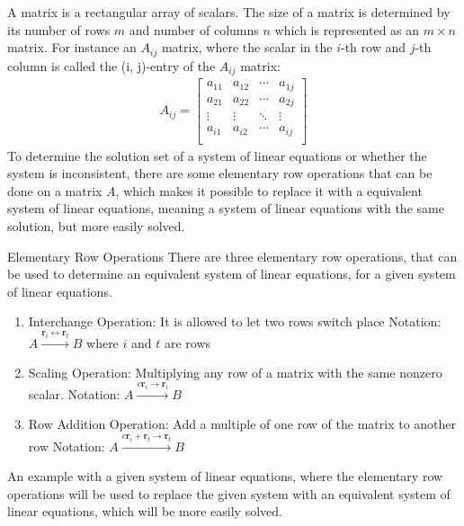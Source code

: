 A matrix is a rectangular array of scalars. The size of a matrix is determined by its number of rows $m$ and number of columns $n$ which is represented as an $m \times n$ matrix. 
For instance an $A_{ij}$ matrix, where the scalar in the $i$-th row and $j$-th column is called the (i, j)-entry of the $A_{ij}$ matrix:
\begin{align*}
    A_{ij} = 
    \begin{bmatrix}
    a_{1 1} & a_{1 2} & \cdots & a_{1 j}\\
    a_{2 1} & a_{2 2} & \cdots & a_{2 j}\\
    \vdots  &   \vdots &  \ddots   & \vdots \\
    a_{i 1} & a_{i 2} & \cdots & a_{i j}\\
    \end{bmatrix}
\end{align*}
\cite[4]{LiAl}
To determine the solution set of a system of linear equations or whether the system is inconsistent, there are some elementary row operations that can be done on a matrix $A$, which makes it possible to replace it with a equivalent system of linear equations, meaning a system of linear equations with the same solution, but more easily solved.
\begin{definition}{Elementary Row Operations}
There are three elementary row operations, that can be used to determine an equivalent system of linear equations, for a given system of linear equations.
\begin{enumerate}
    \item Interchange Operation:
    It is allowed to let two rows switch place 
    Notation: $A\xrightarrow{\textbf{r}_i\leftrightarrow \textbf{r}_t} B$ where $i$ and $t$ are rows
    \item Scaling Operation:
    Multiplying any row of a matrix with the same nonzero scalar.
    Notation: $A\xrightarrow{c\textbf{r}_i\rightarrow \textbf{r}_i} B$
    \item Row Addition Operation:
    Add a multiple of one row of the matrix to another row
    Notation: $A\xrightarrow{c\textbf{r}_i+\textbf{r}_t\rightarrow \textbf{r}_t} B$
\end{enumerate}
\cite[32]{LiAl}
\end {definition}
An example with a given system of linear equations, where the  elementary row operations will be used to replace the given system with an equivalent system of linear equations, which will be more easily solved.
